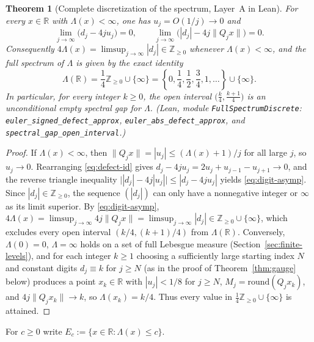 \documentclass[11pt]{article}
\newtheorem{theorem}{Theorem}
\theoremstyle{definition}
\theoremstyle{remark}
\newcommand{\R}{\mathbb{R}}
\newcommand{\Z}{\mathbb{Z}}
\newcommand{\Lam}{\Lambda}
\begin{document}
\begin{theorem}[Complete discretization of the spectrum, Layer~A in Lean]\label{thm:full-spectrum}
For every $x\in\R$ with $\Lam(x)<\infty$, one has $u_j=O(1/j)\to0$ and
\begin{equation}\label{eq:digit-asymp}
\lim_{j\to\infty}\bigl(d_j-4ju_j\bigr)=0,\qquad
\lim_{j\to\infty}\bigl(|d_j|-4j\|Q_jx\|\bigr)=0.
\end{equation}
Consequently $4\Lam(x)=\limsup_{j\to\infty}|d_j|\in\Z_{\ge0}$ whenever
$\Lam(x)<\infty$, and the full spectrum of $\Lam$ is given by the exact identity
\begin{equation}\label{eq:full-spectrum}
\Lam(\R)=\frac14\Z_{\ge0}\cup\{\infty\}
=\left\{0,\frac14,\frac12,\frac34,1,\dots\right\}\cup\{\infty\}.
\end{equation}
In particular, for every integer $k\ge0$, the open interval
$\bigl(\frac{k}{4},\frac{k+1}{4}\bigr)$ is an unconditional empty spectral gap
for $\Lam$.
(Lean, module \texttt{FullSpectrumDiscrete}:
\texttt{euler\_\allowbreak signed\_\allowbreak defect\_\allowbreak approx},
\texttt{euler\_\allowbreak abs\_\allowbreak defect\_\allowbreak approx}, and
\texttt{spectral\_\allowbreak gap\_\allowbreak open\_\allowbreak interval}.)
\end{theorem}

\begin{proof}
If $\Lam(x)<\infty$, then $\|Q_jx\|=|u_j|\le(\Lam(x)+1)/j$ for all large $j$,
so $u_j\to0$. Rearranging \eqref{eq:defect-id} gives
$d_j-4ju_j=2u_j+u_{j-1}-u_{j+1}\to0$, and the reverse triangle inequality
$\bigl||d_j|-4j|u_j|\bigr|\le|d_j-4ju_j|$ yields \eqref{eq:digit-asymp}.
Since $|d_j|\in\Z_{\ge0}$, the sequence $(|d_j|)$ can only have a nonnegative
integer or $\infty$ as its limit superior. By \eqref{eq:digit-asymp},
$4\Lam(x)=\limsup_{j\to\infty}4j\|Q_jx\|=\limsup_{j\to\infty}|d_j|\in\Z_{\ge0}\cup\{\infty\}$,
which excludes every open interval $(k/4,(k+1)/4)$ from $\Lam(\R)$.
Conversely, $\Lam(0)=0$, $\Lam=\infty$ holds on a set of full Lebesgue measure
(Section~\ref{sec:finite-levels}), and for each integer $k\ge1$ choosing a
sufficiently large starting index $N$ and constant digits $d_j\equiv k$ for
$j\ge N$ (as in the proof of Theorem~\ref{thm:gauge} below) produces a point
$x_k\in\R$ with $|u_j|<1/8$ for $j\ge N$, $M_j=\mathrm{round}(Q_jx_k)$, and
$4j\|Q_jx_k\|\to k$, so $\Lam(x_k)=k/4$. Thus every value in
$\frac14\Z_{\ge0}\cup\{\infty\}$ is attained.
\end{proof}

For $c\ge0$ write $E_c:=\{x\in\R:\Lam(x)\le c\}$.
\end{document}
